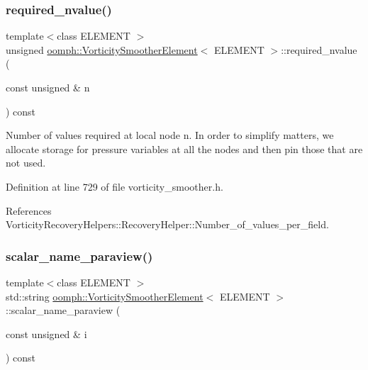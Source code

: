 \subsubsection{\texorpdfstring{required\+\_\+nvalue()}{required\_nvalue()}}
{\footnotesize\ttfamily template$<$class E\+L\+E\+M\+E\+NT $>$ \\
unsigned \hyperlink{classoomph_1_1VorticitySmootherElement}{oomph\+::\+Vorticity\+Smoother\+Element}$<$ E\+L\+E\+M\+E\+NT $>$\+::required\+\_\+nvalue (\begin{DoxyParamCaption}\item[{const unsigned \&}]{n }\end{DoxyParamCaption}) const\hspace{0.3cm}{\ttfamily [inline]}}



Number of values required at local node n. In order to simplify matters, we allocate storage for pressure variables at all the nodes and then pin those that are not used. 



Definition at line 729 of file vorticity\+\_\+smoother.\+h.



References Vorticity\+Recovery\+Helpers\+::\+Recovery\+Helper\+::\+Number\+\_\+of\+\_\+values\+\_\+per\+\_\+field.

\mbox{\label{classoomph_1_1VorticitySmootherElement_af4f47bc30f0a157c2235c19243a88b0d}} 
\subsubsection{\texorpdfstring{scalar\+\_\+name\+\_\+paraview()}{scalar\_name\_paraview()}}
{\footnotesize\ttfamily template$<$class E\+L\+E\+M\+E\+NT $>$ \\
std\+::string \hyperlink{classoomph_1_1VorticitySmootherElement}{oomph\+::\+Vorticity\+Smoother\+Element}$<$ E\+L\+E\+M\+E\+NT $>$\+::scalar\+\_\+name\+\_\+paraview (\begin{DoxyParamCaption}\item[{const unsigned \&}]{i }\end{DoxyParamCaption}) const\hspace{0.3cm}{\ttfamily [inline]}}



